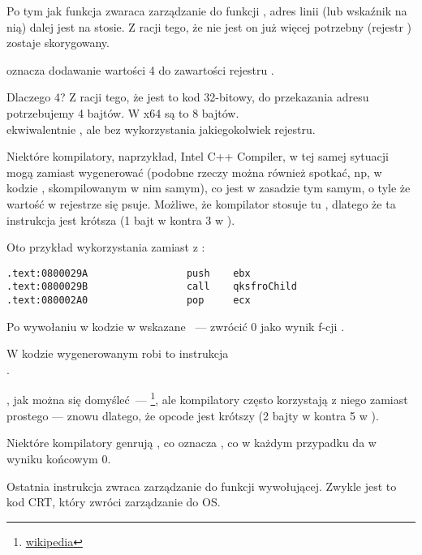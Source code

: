 Po tym jak funkcja \printf zwaraca zarządzanie do funkcji \main, adres linii (lub wskaźnik na nią) dalej jest na stosie.
Z racji tego, że nie jest on już więcej potrzebny  (rejestr \ESP) zostaje skorygowany.

 oznacza dodawanie wartości 4 do zawartości rejestru \ESP.

Dlaczego 4? Z racji tego, że jest to kod 32-bitowy, do przekazania adresu potrzebujemy 4 bajtów. W x64 są to 8 bajtów.\\
 ekwiwalentnie , ale bez wykorzystania jakiegokolwiek rejestru.

\myindex{\oracle}

Niektóre kompilatory, naprzykład, Intel C++ Compiler, w tej samej sytuacji mogą zamiast 
\ADD wygenerować  (podobne rzeczy można również spotkać, np, w kodzie \oracle{}, skompilowanym w nim samym),
co jest w zasadzie tym samym, o tyle że wartość w rejestrze \ECX się psuje.
Możliwe, że kompilator stosuje tu , dlatego że ta instrukcja jest krótsza (1 bajt w  kontra 3 w ).

Oto przykład wykorzystania \POP zamiast \ADD z \oracle{}:

\begin{lstlisting}[caption=\oracle 10.2 Linux (plik app.o),style=customasmx86]
.text:0800029A                 push    ebx
.text:0800029B                 call    qksfroChild
.text:080002A0                 pop     ecx
\end{lstlisting}

Po wywołaniu \printf w kodzie w \CCpp wskazane ~--- zwrócić 0 jako wynik f-cji \main.

W kodzie wygenerowanym robi to instrukcja \\
.


\XOR, jak można się domyśleć~--- \footnote{\href{http://go.yurichev.com/17118}{wikipedia}}, ale kompilatory często korzystają z niego zamiast prostego
 --- znowu dlatego, że opcode jest krótszy (2 bajty w \XOR kontra 5 w \MOV).

Niektóre kompilatory genrują , co oznacza  \EAX {}\EAX, co w każdym przypadku da w wyniku końcowym 0.

Ostatnia instrukcja \RET zwraca zarządzanie do funkcji wywołującej. Zwykle jest to kod \CCpp \ac{CRT}, który zwróci zarządzanie do \ac{OS}.



